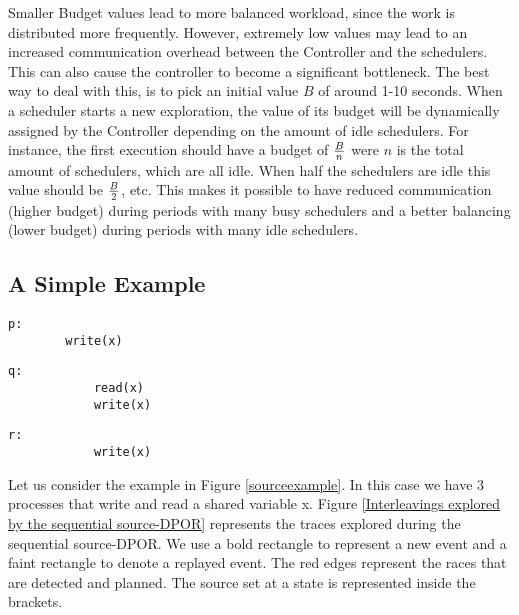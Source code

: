 Smaller Budget values lead to more balanced workload, since the work is distributed more frequently. However,
extremely low values may lead to an increased communication overhead between the Controller and the schedulers.
This can also cause the controller to become a significant bottleneck. The best way to deal with this,
is to pick an initial value $B$ of around 1-10 seconds. When a scheduler starts a new exploration,
the value of its budget will be dynamically assigned by the Controller depending on the amount of
idle schedulers. For instance, the first execution should have a budget of $B \over n$ were $n$ is the total amount of
schedulers, which are all idle. When half the schedulers are idle this value should be $B \over 2$, etc. This makes it possible to have
reduced communication (higher budget) during periods with many busy schedulers and a better balancing
(lower budget) during periods with many idle schedulers.

\subsection{A Simple Example}


\begin{figure*}
    \begin{minipage}{0.3\textwidth}
      \begin{lstlisting}[frame=none, numbers=none]
        p:
        write(x)
      \end{lstlisting}
    \end{minipage}
    \begin{minipage}{0.3\textwidth}
        \begin{lstlisting}[frame=none, numbers=none]
            q:
            read(x)
            write(x)
        \end{lstlisting}
      \end{minipage}
      \begin{minipage}{0.3\textwidth}
        \begin{lstlisting}[frame=none, numbers=none]
            r:
            write(x)
        \end{lstlisting}
      \end{minipage}
      \caption{Simple readers-writes example}
      \label{sourceexample}
  \end{figure*}

Let us consider the example in Figure \ref{sourceexample}. In this case we have 3 processes that write and read a shared variable x.
Figure \ref{Interleavings explored by the sequential source-DPOR} represents the traces explored during the sequential source-DPOR.
We use a bold rectangle to represent a new event and a faint rectangle to denote a replayed event. The red edges represent
the races that are detected and planned. The source set at a state is represented inside the brackets.

